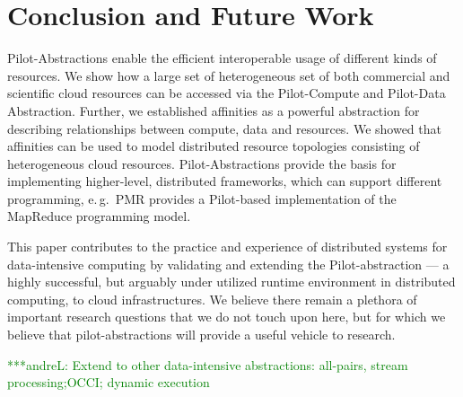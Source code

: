 \documentclass[times]{cpeauth}
\newcommand{\alnote}[1]{ {\textcolor{green} { ***andreL: #1 }}}
\newcommand{\alnote}[1]{}
\newcommand{\pilot}{Pilot\xspace}
\newcommand{\pilotcompute}{Pilot-Compute\xspace}
\newcommand{\pilotdata}{Pilot-Data\xspace}
\begin{document}

\section{Conclusion and Future Work}

\pilot-Abstractions enable the efficient interoperable usage of
different kinds of resources. We show how a large set of heterogeneous
set of both commercial and scientific cloud resources can be accessed
via the \pilotcompute and \pilotdata Abstraction. Further, we
established affinities as a powerful abstraction for describing
relationships between compute, data and resources. We showed that
affinities can be used to model distributed resource topologies
consisting of heterogeneous cloud resources.  \pilot-Abstractions
provide the basis for implementing higher-level, distributed
frameworks, which can support different programming, e.\,g.\ PMR
provides a \pilot-based implementation of the MapReduce programming
model.

This paper contributes to the practice and experience of distributed
systems for data-intensive computing by validating and extending the
\pilot-abstraction --- a highly successful, but arguably under
utilized runtime environment in distributed computing, to cloud
infrastructures. We believe there remain a plethora of important
research questions that we do not touch upon here, but for which we
believe that pilot-abstractions will provide a useful vehicle to
research.

\alnote{Extend to other data-intensive abstractions: all-pairs, stream
  processing;OCCI; dynamic execution}
\end{document}
